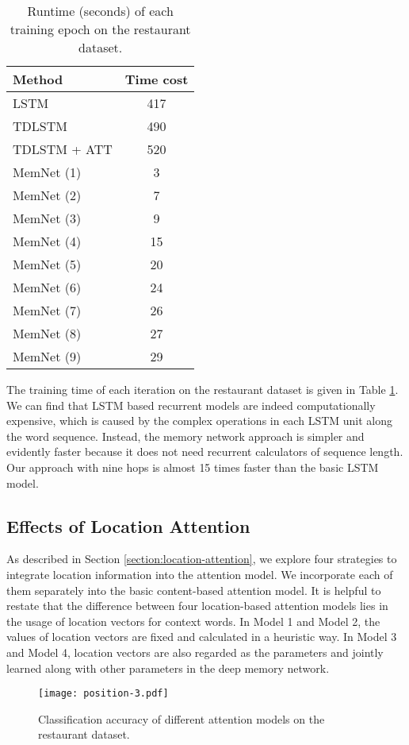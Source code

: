 \documentclass[11pt,letterpaper]{article}
\begin{document}
\begin{table}[h]
	\centering
	\begin{tabular}{l|c}
		\hline
		Method & Time cost\\
		\hline
		LSTM & 417 \\
		TDLSTM & 490 \\
		TDLSTM + ATT & 520 \\
		\hline
		MemNet (1) & 3 \\
		MemNet (2)& 7\\
		MemNet (3)& 9 \\
		MemNet (4)& 15\\
		MemNet (5)& 20\\
		MemNet (6)& 24\\
		MemNet (7)& 26\\
		MemNet (8)& 27\\
		MemNet (9)& 29\\
		\hline
	\end{tabular}
	\caption{Runtime (seconds) of each training epoch on the restaurant dataset.}
	\label{table:time-cost}
\end{table}
The training time of each iteration on the restaurant dataset is given in Table \ref{table:time-cost}. 
We can find that LSTM based recurrent models are indeed computationally expensive, which is caused by the complex operations in each LSTM unit along the word sequence. 
Instead, the memory network approach is simpler and evidently faster because it does not need recurrent calculators of sequence length.
Our approach with nine hops is almost 15 times faster than the basic LSTM model. 

\subsection{Effects of Location Attention}
As described in Section \ref{section:location-attention}, we explore four strategies to integrate location information into the attention model. 
We incorporate each of them separately into the basic content-based attention model.
It is helpful to restate that the difference between four location-based attention models lies in the usage of location vectors for context words. In Model 1 and Model 2, the values of location vectors are fixed and calculated in a heuristic way. In Model 3 and Model 4,
location vectors are also regarded as the parameters and jointly learned along with other parameters in the deep memory network. 

\begin{figure}[h]
	\centering
	\texttt{[image: position-3.pdf]}
	\caption{Classification accuracy of different attention models on the restaurant dataset. }
	\label{fig:location}
\end{figure}
\end{document}
